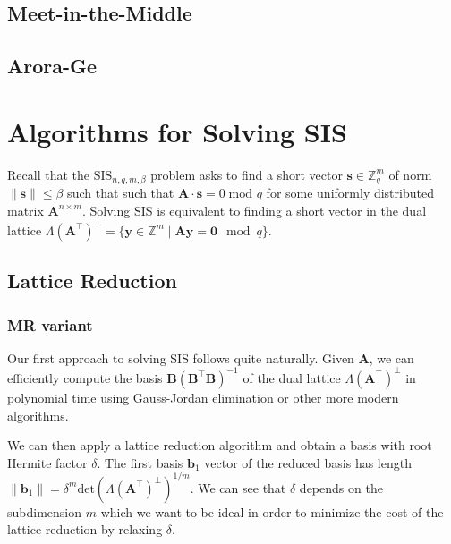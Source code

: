 


\subsection{Meet-in-the-Middle \cite{APS15}}



\subsection{Arora-Ge \cite{AG11}}




\section{Algorithms for Solving SIS}
Recall that the SIS$_{n, q, m, \beta}$ problem asks to find a short vector $\mathbf{s} \in \mathbb{Z}_q^m$ of norm $\|\mathbf{s}\| \leq \beta$ such that such that $\mathbf{A} \cdot \mathbf{s} = 0 \; \text{mod } q$ for some uniformly distributed matrix $\mathbf{A}^{n\times m}$. Solving SIS is equivalent to finding a short vector in the dual lattice $\Lambda(\mathbf{A}^\intercal)^{\perp} = \{ \mathbf{y} \in \mathbb{Z}^m \mid \mathbf{A} \mathbf{y} = \mathbf{0} \mod q\}$.


\subsection{Lattice Reduction \cite{MR09, RS10}}
\subsubsection{MR variant \cite{MR09}} \label{sec:mr-variant}
Our first approach to solving SIS follows quite naturally. Given $\mathbf{A}$, we can efficiently compute the basis $\mathbf{B} (\mathbf{B}^\intercal \mathbf{B})^{-1}$ of the dual lattice $\Lambda(\mathbf{A}^\intercal)^{\perp}$ in polynomial time using Gauss-Jordan elimination or other more modern algorithms.

We can then apply a lattice reduction algorithm and obtain a basis with root Hermite factor $\delta$. The first basis $\mathbf{b}_1$ vector of the reduced basis has length $\|\mathbf{b}_1\| = \delta^m \text{det}(\Lambda(\mathbf{A}^\intercal)^{\perp})^{1/m}$. We can see that $\delta$ depends on the subdimension $m$ which we want to be ideal in order to minimize the cost of the lattice reduction by relaxing $\delta$.

